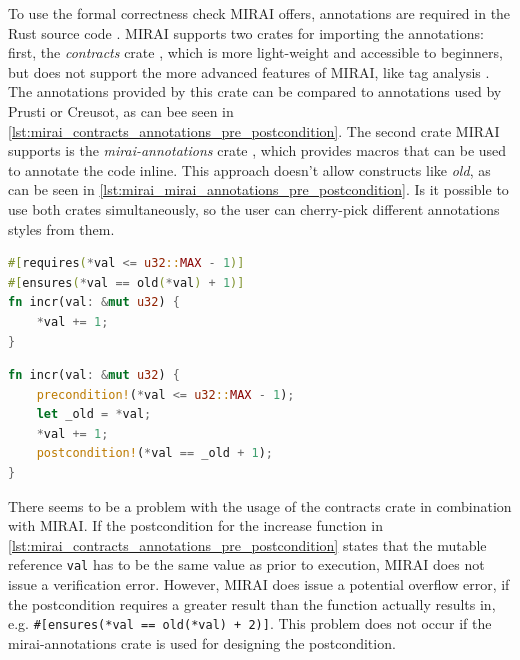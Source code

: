 To use the formal correctness check MIRAI offers, annotations are required in the Rust source code \cite{facebookexperimental_miraidocumentationoverviewmd_2021}. MIRAI supports two crates for importing the annotations: first, the \textit{contracts} crate \cite{karroffel_contracts_2023}, which is more light-weight and accessible to beginners, but does not support the more advanced features of MIRAI, like tag analysis \cite{facebookexperimental_miraidocumentationoverviewmd_2021}. The annotations provided by this crate can be compared to annotations used by Prusti or Creusot, as can bee seen in \autoref{lst:mirai_contracts_annotations_pre_postcondition}. The second crate MIRAI supports is the \textit{mirai-annotations} crate \cite{herman_venter_mirai-annotations_2023}, which provides macros that can be used to annotate the code inline. This approach doesn't allow constructs like \textit{old}, as can be seen in \autoref{lst:mirai_mirai_annotations_pre_postcondition}. Is it possible to use both crates simultaneously, so the user can cherry-pick different annotations styles from them.

\begin{lstlisting}[float, language=Rust, caption=Example Rust code of an increase function with a pre- and postcondition from the contracts crate for MIRAI, label={lst:mirai_contracts_annotations_pre_postcondition}]
#[requires(*val <= u32::MAX - 1)]
#[ensures(*val == old(*val) + 1)]
fn incr(val: &mut u32) {
    *val += 1;
}
\end{lstlisting}

\begin{lstlisting}[float, language=Rust, caption=Example Rust code of an increase function with a pre- and postcondition from the mirai-annotations crate for MIRAI, label={lst:mirai_mirai_annotations_pre_postcondition}]
fn incr(val: &mut u32) {
    precondition!(*val <= u32::MAX - 1);
    let _old = *val;
    *val += 1;
    postcondition!(*val == _old + 1);
}
\end{lstlisting}

There seems to be a problem with the usage of the contracts crate in combination with MIRAI. If the postcondition for the increase function in \autoref{lst:mirai_contracts_annotations_pre_postcondition} states that the mutable reference \lstinline{val} has to be the same value as prior to execution, MIRAI does not issue a verification error. However, MIRAI does issue a potential overflow error, if the postcondition requires a greater result than the function actually results in, e.g. \lstinline{#[ensures(*val == old(*val) + 2)]}. This problem does not occur if the mirai-annotations crate is used for designing the postcondition.

